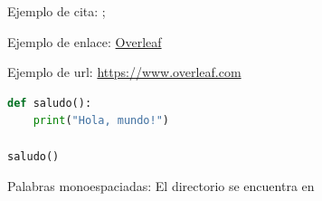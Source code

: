 Ejemplo de cita: \cite{dinosaurios2006}; \parencite{dinosaurios2006}

Ejemplo de enlace: \href{https://www.overleaf.com}{Overleaf}

Ejemplo de url: \url{https://www.overleaf.com}

\begin{lstlisting}[language=Python, caption=Hola Mundo en Python]
def saludo():
    print("Hola, mundo!")

saludo()
\end{lstlisting}

\begin{sloppypar}
    Palabras monoespaciadas: El directorio  se encuentra en 
\end{sloppypar}